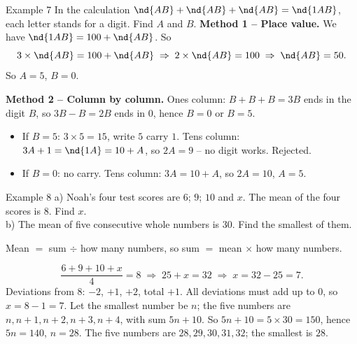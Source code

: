 \begin{exbox}{Example 7}
In the calculation $\nd{AB} + \nd{AB} + \nd{AB} = \nd{1AB}$, each letter stands for a digit. Find $A$ and $B$.
\guide
\textbf{Method 1 -- Place value.} We have $\nd{1AB} = 100 + \nd{AB}$. So
\[ 3\times\nd{AB} = 100 + \nd{AB} \;\Rightarrow\; 2\times\nd{AB} = 100 \;\Rightarrow\; \nd{AB} = 50. \]
So $A = 5$, $B = 0$.

\textbf{Method 2 -- Column by column.} Ones column: $B + B + B = 3B$ ends in the digit $B$, so $3B - B = 2B$ ends in $0$,
hence $B = 0$ or $B = 5$.
\begin{itemize}[leftmargin=1.4em,itemsep=1pt,topsep=1pt]
  \item If $B = 5$: $3\times 5 = 15$, write $5$ carry $1$. Tens column: $3A + 1 = \nd{1A} = 10 + A$, so $2A = 9$ -- no digit
  works. Rejected.
  \item If $B = 0$: no carry. Tens column: $3A = 10 + A$, so $2A = 10$, $A = 5$.
\end{itemize}
\end{exbox}

\begin{exbox}{Example 8}
a) Noah's four test scores are $6$; $9$; $10$ and $x$. The mean of the four scores is $8$. Find $x$.\\
b) The mean of five consecutive whole numbers is $30$. Find the smallest of them.
\guide
{}
\begin{recallbox}Mean $=$ sum $\div$ how many numbers, so sum $=$ mean $\times$ how many numbers.\end{recallbox}
\[ \frac{6 + 9 + 10 + x}{4} = 8 \;\Rightarrow\; 25 + x = 32 \;\Rightarrow\; x = 32 - 25 = 7. \]
Deviations from $8$: $-2$, $+1$, $+2$, total $+1$. All deviations must add up to $0$, so $x = 8 - 1 = 7$.
Let the smallest number be $n$; the five numbers are $n, n+1, n+2, n+3, n+4$, with sum $5n + 10$. So
$5n + 10 = 5\times 30 = 150$, hence $5n = 140$, $n = 28$.
The five numbers are $28, 29, 30, 31, 32$; the smallest is $28$.
\end{exbox}

\clearpage
{}

